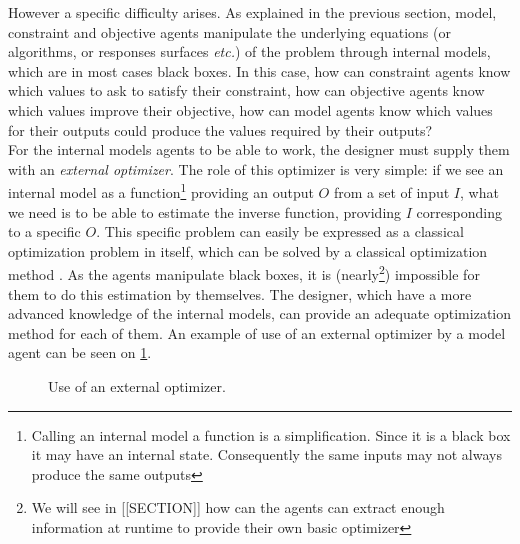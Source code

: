 However a specific difficulty arises. As explained in the previous section, model, constraint and objective agents manipulate the underlying equations (or algorithms, or responses surfaces \emph{etc.}) of the problem through internal models, which are in most cases black boxes. In this case, how can constraint agents know which values to ask to satisfy their constraint, how can objective agents know which values improve their objective, how can model agents know which values for their outputs could produce the values required by their outputs?\\
For the internal models agents to be able to work, the designer must supply them with an \emph{external optimizer}. The role of this optimizer is very simple: if we see an internal model as a function\footnote{Calling an internal model a function is a simplification. Since it is a black box it may have an internal state. Consequently the same inputs may not always produce the same outputs} providing an output $O$ from a set of input $I$, what we need is to be able to estimate the inverse function, providing $I$ corresponding to a specific $O$. This specific problem can easily be expressed as a classical optimization problem in itself, which can be solved by a classical optimization method . As the agents manipulate black boxes, it is (nearly\footnote{We will see in [[SECTION]] how can the agents can extract enough information at runtime to provide their own basic optimizer}) impossible for them to do this estimation by themselves. The designer, which have a more advanced knowledge of the internal models, can provide an adequate optimization method for each of them.
An example of use of an external optimizer by a model agent can be seen on \figurename{} \ref{optim_use}.

\begin{figure}
\centering
{}
\hfill
{}
\hfill
{}
\caption{Use of an external optimizer.}\label{optim_use}
\end{figure}

